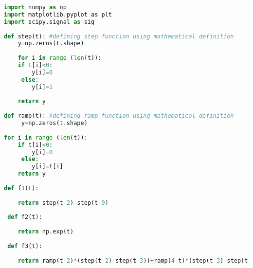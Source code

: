 \documentclass[12pt, titlepage]{article}
\begin{document}
            \begin{lstlisting}[language=Python, caption=Part 1 Code]
import numpy as np
import matplotlib.pyplot as plt
import scipy.signal as sig
            
def step(t): #defining step function using mathematical definition
    y=np.zeros(t.shape)
                
    for i in range (len(t)):
    if t[i]<0:
        y[i]=0
     else:
        y[i]=1
                        
    return y    
            
def ramp(t): #defining ramp function using mathematical definition
     y=np.zeros(t.shape)
                
for i in range (len(t)):
    if t[i]<0:
        y[i]=0
     else:
        y[i]=t[i]
    return y  
            
def f1(t):
                
    return step(t-2)-step(t-9)
            
 def f2(t):
                
    return np.exp(t)
            
 def f3(t):
                
    return ramp(t-2)*(step(t-2)-step(t-3))+ramp(4-t)*(step(t-3)-step(t-4))
            \end{lstlisting}
            
\end{document}
